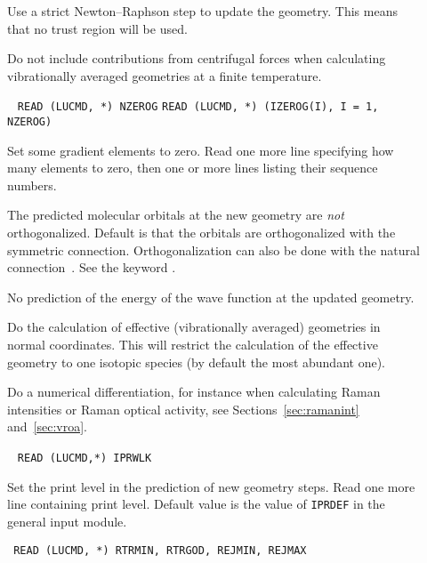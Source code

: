\begin{description}
\item[] Use a strict
Newton--Raphson step to update
the geometry. This means that no trust region will be used.

\item[] Do not include contributions from
centrifugal forces when calculating vibrationally averaged geometries
at a finite temperature.

\item[]\verb| |\newline
\verb|READ (LUCMD, *) NZEROG|\newline
\verb|READ (LUCMD, *) (IZEROG(I), I = 1, NZEROG)|

 Set some gradient elements  to zero.  Read
one more line specifying how many elements to zero, then one
or more lines listing their sequence numbers.

\item[] The predicted molecular orbitals at the new
geometry are {\em not} orthogonalized. Default is that the orbitals
are orthogonalized with the symmetric connection. Orthogonalization
can also be done with the natural
connection~\cite{joklbkrthpjtca90}. See the keyword .

\item[] No prediction of the energy of the wave function
at the updated geometry.

\item[] Do the calculation of effective (vibrationally
averaged) geometries in normal coordinates. This will restrict the
calculation of the effective geometry to one isotopic species (by
default the most abundant one).

\item[] Do a numerical
differentiation, for instance when
calculating Raman intensities or Raman optical activity, see
Sections~\ref{sec:ramanint} and~\ref{sec:vroa}.

\item[]\verb| |\newline
\verb|READ (LUCMD,*) IPRWLK|

Set the print level in the prediction of new geometry steps.  Read one
more line containing print level. Default value is the value of
\verb|IPRDEF| in the general input module.

\item[]\verb| |\newline
\verb|READ (LUCMD, *) RTRMIN, RTRGOD, REJMIN, REJMAX|


\end{description}

